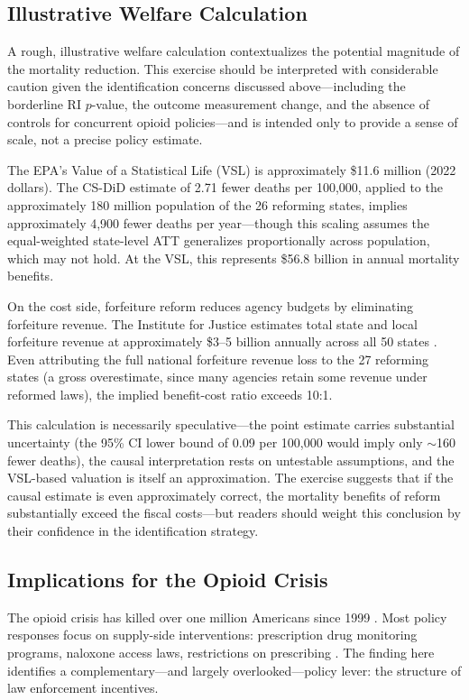 \documentclass[12pt]{article}
\begin{document}
\subsection{Illustrative Welfare Calculation}

A rough, illustrative welfare calculation contextualizes the potential magnitude of the mortality reduction. This exercise should be interpreted with considerable caution given the identification concerns discussed above---including the borderline RI $p$-value, the outcome measurement change, and the absence of controls for concurrent opioid policies---and is intended only to provide a sense of scale, not a precise policy estimate.

The EPA's Value of a Statistical Life (VSL) is approximately \$11.6 million (2022 dollars). The CS-DiD estimate of 2.71 fewer deaths per 100,000, applied to the approximately 180 million population of the 26 reforming states, implies approximately 4,900 fewer deaths per year---though this scaling assumes the equal-weighted state-level ATT generalizes proportionally across population, which may not hold. At the VSL, this represents \$56.8 billion in annual mortality benefits.

On the cost side, forfeiture reform reduces agency budgets by eliminating forfeiture revenue. The Institute for Justice estimates total state and local forfeiture revenue at approximately \$3--5 billion annually across all 50 states \citep{ij2020policing}. Even attributing the full national forfeiture revenue loss to the 27 reforming states (a gross overestimate, since many agencies retain some revenue under reformed laws), the implied benefit-cost ratio exceeds 10:1.

This calculation is necessarily speculative---the point estimate carries substantial uncertainty (the 95\% CI lower bound of 0.09 per 100,000 would imply only $\sim$160 fewer deaths), the causal interpretation rests on untestable assumptions, and the VSL-based valuation is itself an approximation. The exercise suggests that if the causal estimate is even approximately correct, the mortality benefits of reform substantially exceed the fiscal costs---but readers should weight this conclusion by their confidence in the identification strategy.

\subsection{Implications for the Opioid Crisis}

The opioid crisis has killed over one million Americans since 1999 \citep{case2020deaths}. Most policy responses focus on supply-side interventions: prescription drug monitoring programs, naloxone access laws, restrictions on prescribing \citep{powell2020opioid}. The finding here identifies a complementary---and largely overlooked---policy lever: the structure of law enforcement incentives.
\end{document}
